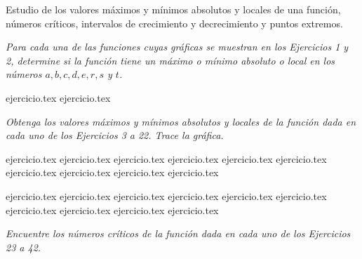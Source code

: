 
Estudio de los valores máximos y mínimos absolutos y locales de una función, números críticos, intervalos de crecimiento y decrecimiento y puntos extremos.

\noindent \textit{Para cada una de las funciones cuyas gráficas se muestran en los Ejercicios 1 y 2, determine si la función tiene un máximo o mínimo absoluto o local en los números $a, b, c, d, e, r, s$ y $t$.}

\begin{enumerate}
    {ejercicio.tex}
    {ejercicio.tex}
\end{enumerate}

\noindent \textit{Obtenga los valores máximos y mínimos absolutos y locales de la función dada en cada uno de los Ejercicios 3 a 22. Trace la gráfica.}

\begin{enumerate}
    \setcounter{enumi}{2}
    \begin{minipage}{0.45\textwidth}
    {ejercicio.tex}
    {ejercicio.tex}
    {ejercicio.tex}
    {ejercicio.tex}
    {ejercicio.tex}
    {ejercicio.tex}
    {ejercicio.tex}
    {ejercicio.tex}
    {ejercicio.tex}
    {ejercicio.tex}
    \end{minipage}%
    \begin{minipage}{0.45\textwidth}
    {ejercicio.tex}
    {ejercicio.tex}
    {ejercicio.tex}
    {ejercicio.tex}
    {ejercicio.tex}
    {ejercicio.tex}
    {ejercicio.tex}
    {ejercicio.tex}
    {ejercicio.tex}
    {ejercicio.tex}
    \end{minipage}
\end{enumerate}

\vspace{1em}
\noindent \textit{Encuentre los números críticos de la función dada en cada uno de los Ejercicios 23 a 42.}

